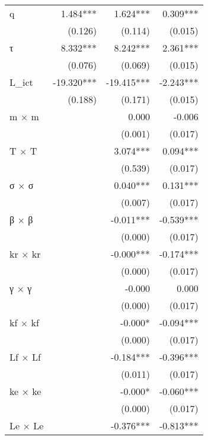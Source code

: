 \begin{tabular}{lrrr}
q                      &   1.484*** &   1.624*** &   0.309*** \\ 
                       &    (0.126) &    (0.114) &    (0.015) \\ 
τ                      &   8.332*** &   8.242*** &   2.361*** \\ 
                       &    (0.076) &    (0.069) &    (0.015) \\ 
L\_ict                 & -19.320*** & -19.415*** &  -2.243*** \\ 
                       &    (0.188) &    (0.171) &    (0.015) \\ 
m $\times$ m           &            &      0.000 &     -0.006 \\ 
                       &            &    (0.001) &    (0.017) \\ 
T $\times$ T           &            &   3.074*** &   0.094*** \\ 
                       &            &    (0.539) &    (0.017) \\ 
σ $\times$ σ           &            &   0.040*** &   0.131*** \\ 
                       &            &    (0.007) &    (0.017) \\ 
β $\times$ β           &            &  -0.011*** &  -0.539*** \\ 
                       &            &    (0.000) &    (0.017) \\ 
kr $\times$ kr         &            &  -0.000*** &  -0.174*** \\ 
                       &            &    (0.000) &    (0.017) \\ 
γ $\times$ γ           &            &     -0.000 &      0.000 \\ 
                       &            &    (0.000) &    (0.017) \\ 
kf $\times$ kf         &            &    -0.000* &  -0.094*** \\ 
                       &            &    (0.000) &    (0.017) \\ 
Lf $\times$ Lf         &            &  -0.184*** &  -0.396*** \\ 
                       &            &    (0.011) &    (0.017) \\ 
ke $\times$ ke         &            &    -0.000* &  -0.060*** \\ 
                       &            &    (0.000) &    (0.017) \\ 
Le $\times$ Le         &            &  -0.376*** &  -0.813*** \\ 

\end{tabular}
